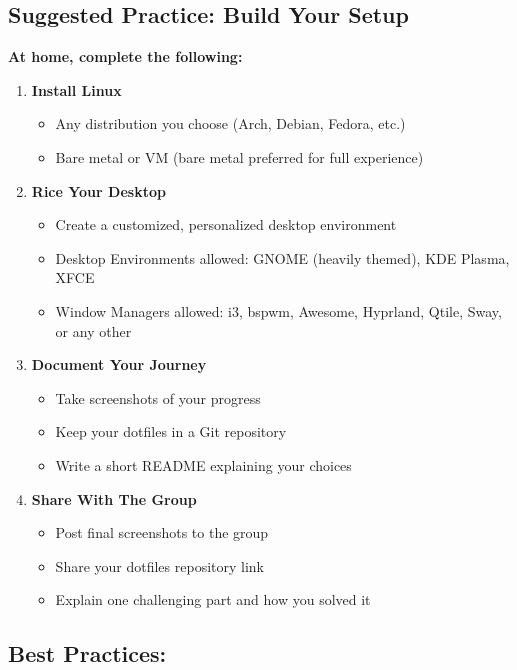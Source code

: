 \documentclass[12pt]{article}
\begin{document}
\subsection*{Suggested Practice: Build Your Setup}

\textbf{At home, complete the following:}

\begin{enumerate}
    \item \textbf{Install Linux}
    \begin{itemize}
        \item Any distribution you choose (Arch, Debian, Fedora, etc.)
        \item Bare metal or VM (bare metal preferred for full experience)
    \end{itemize}
    
    \item \textbf{Rice Your Desktop}
    \begin{itemize}
        \item Create a customized, personalized desktop environment
        \item Desktop Environments allowed: GNOME (heavily themed), KDE Plasma, XFCE
        \item Window Managers allowed: i3, bspwm, Awesome, Hyprland, Qtile, Sway, or any other
    \end{itemize}
    
    \item \textbf{Document Your Journey}
    \begin{itemize}
        \item Take screenshots of your progress
        \item Keep your dotfiles in a Git repository
        \item Write a short README explaining your choices
    \end{itemize}
    
    \item \textbf{Share With The Group}
    \begin{itemize}
        \item Post final screenshots to the group
        \item Share your dotfiles repository link
        \item Explain one challenging part and how you solved it
    \end{itemize}
\end{enumerate}

\subsection*{Best Practices:}
\end{document}
